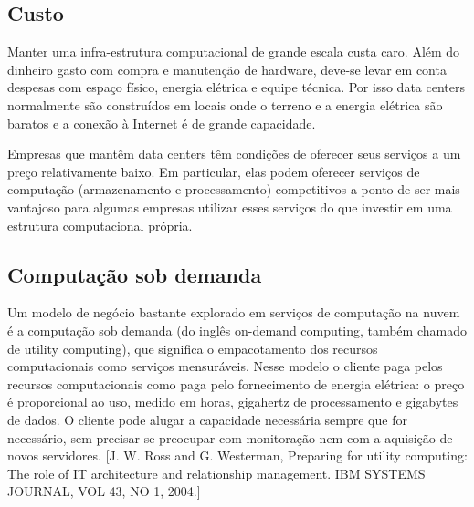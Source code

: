 
\subsection{Custo}

Manter uma infra-estrutura computacional de grande escala custa caro. Além do dinheiro gasto com compra e manutenção de hardware, deve-se levar em conta despesas com espaço físico, energia elétrica e equipe técnica. Por isso data centers normalmente são construídos em locais onde o terreno e a energia elétrica são baratos e a conexão à Internet é de grande capacidade. 

Empresas que mantêm data centers 
têm condições de oferecer seus serviços a um preço relativamente baixo. Em particular, elas podem oferecer serviços de computação (armazenamento e processamento) competitivos a ponto de ser mais vantajoso para algumas empresas utilizar esses serviços do que investir em uma estrutura computacional própria.



\subsection{Computação sob demanda}

Um modelo de negócio bastante explorado em serviços de computação na nuvem
é a computação sob demanda (do inglês on-demand computing, também chamado de utility computing), que significa o empacotamento dos recursos computacionais como serviços mensuráveis. Nesse modelo o cliente paga pelos recursos computacionais como paga pelo fornecimento de energia elétrica: 
o preço é proporcional ao uso, medido em horas, gigahertz de processamento e gigabytes de dados. O cliente pode alugar a capacidade necessária sempre que for necessário, sem precisar se preocupar com monitoração nem com a aquisição de novos servidores. [J. W. Ross and G. Westerman, Preparing for utility computing: The role of IT architecture and relationship management. IBM SYSTEMS JOURNAL, VOL 43, NO 1, 2004.]

